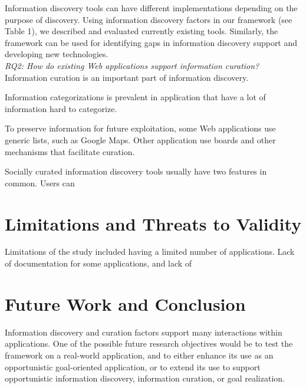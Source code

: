 \documentclass{casconpaper}
\begin{document}
{Information discovery tools can have different implementations depending on the purpose of discovery. Using information discovery factors in our framework (see Table 1), we described and evaluated currently existing tools. Similarly, the framework can be used for identifying gaps in information discovery support and developing new technologies.   \\

\emph{RQ2: How do existing Web applications support information curation?}\\

Information curation is an important part of information discovery.

Information categorizations is prevalent in application that have a lot of information hard to categorize. 

To preserve information for future exploitation, some Web applications use generic lists, such as Google Maps. Other application use boards and other mechanisms that facilitate curation.

Socially curated information discovery tools usually have two features in common. Users can 
 
} %





{\section{Limitations and Threats to Validity}
Limitations of the study included having a limited number of applications. Lack of documentation for some applications, and lack of 
} %

{\section{ Future Work and Conclusion }
Information discovery and curation factors support many interactions within applications. One of the possible future research objectives would be to test the framework on a real-world application, and to either enhance its use as an opportunistic goal-oriented application, or to extend its use  to support opportunistic information discovery, information curation, or goal realization. 

} %
\end{document}
